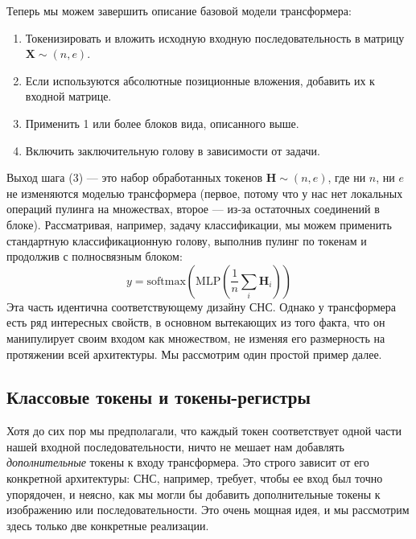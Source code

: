 Теперь мы можем завершить описание базовой модели трансформера:
%
\begin{enumerate}
\item Токенизировать и вложить исходную входную последовательность в матрицу $\mathbf{X} \sim (n,e)$.\\
\item Если используются абсолютные позиционные вложения, добавить их к входной матрице.
\item Применить 1 или более блоков вида, описанного выше.
\item Включить заключительную голову в зависимости от задачи.
\end{enumerate}
%
Выход шага (3) — это набор обработанных токенов $\mathbf{H} \sim (n,e)$, где ни $n$, ни $e$ не изменяются моделью трансформера (первое, потому что у нас нет локальных операций пулинга на множествах, второе — из-за остаточных соединений в блоке). Рассматривая, например, задачу классификации, мы можем применить стандартную классификационную голову, выполнив пулинг по токенам и продолжив с полносвязным блоком:
%
$$
y=\text{softmax}\left(\text{MLP}\left(\frac{1}{n}\sum_i\mathbf{H}_i\right)\right)
$$
%
Эта часть идентична соответствующему дизайну СНС. Однако у трансформера есть ряд интересных свойств, в основном вытекающих из того факта, что он манипулирует своим входом как множеством, не изменяя его размерность на протяжении всей архитектуры. Мы рассмотрим один простой пример далее.

\subsection{Классовые токены и токены-регистры}
\label{subsec:class_register_tokens}

Хотя до сих пор мы предполагали, что каждый токен соответствует одной части нашей входной последовательности, ничто не мешает нам добавлять \textit{дополнительные} токены к входу трансформера. Это строго зависит от его конкретной архитектуры: СНС, например, требует, чтобы ее вход был точно упорядочен, и неясно, как мы могли бы добавить дополнительные токены к изображению или последовательности. Это очень мощная идея, и мы рассмотрим здесь только две конкретные реализации.

